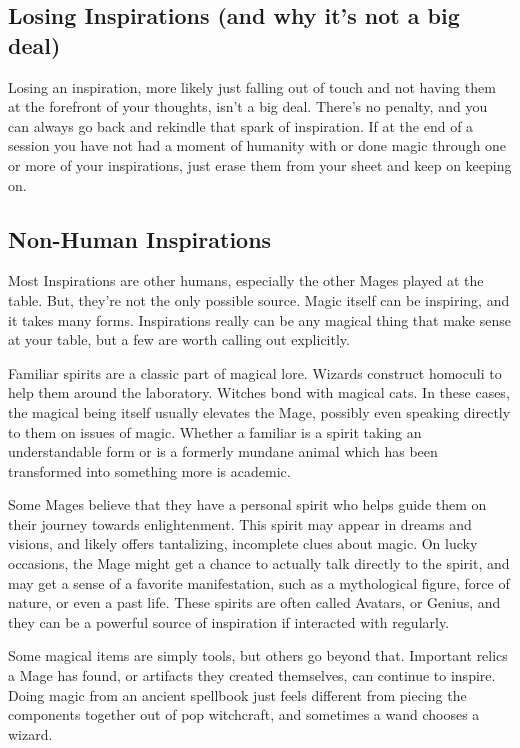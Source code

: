 \documentclass[
  oneside,
  statementpaper,
  9pt]{memoir}
\begin{document}
\hypertarget{losing-inspirations-and-why-its-not-a-big-deal}{%
\subsection{Losing Inspirations (and why it's not a big
deal)}\label{losing-inspirations-and-why-its-not-a-big-deal}}

\begin{Player}

Losing an inspiration, more likely just falling out of touch and not having them at the forefront of your thoughts, isn’t a big deal. There’s no penalty, and you can always go back and rekindle that spark of inspiration. If at the end of a session you have not had a moment of humanity with or done magic through one or more of your inspirations, just erase them from your sheet and keep on keeping on.

\end{Player}

\hypertarget{non-human-inspirations}{%
\subsection{Non-Human Inspirations}\label{non-human-inspirations}}

\begin{Player}

Most Inspirations are other humans, especially the other Mages played at the table. But, they’re not the only possible source. Magic itself can be inspiring, and it takes many forms. Inspirations really can be any magical thing that make sense at your table, but a few are worth calling out explicitly.

Familiar spirits are a classic part of magical lore. Wizards construct homoculi to help them around the laboratory. Witches bond with magical cats. In these cases, the magical being itself usually elevates the Mage, possibly even speaking directly to them on issues of magic. Whether a familiar is a spirit taking an understandable form or is a formerly mundane animal which has been transformed into something more is academic.

Some Mages believe that they have a personal spirit who helps guide them on their journey towards enlightenment. This spirit may appear in dreams and visions, and likely offers tantalizing, incomplete clues about magic. On lucky occasions, the Mage might get a chance to actually talk directly to the spirit, and may get a sense of a favorite manifestation, such as a mythological figure, force of nature, or even a past life. These spirits are often called Avatars, or Genius, and they can be a powerful source of inspiration if interacted with regularly.

Some magical items are simply tools, but others go beyond that. Important relics a Mage has found, or artifacts they created themselves, can continue to inspire. Doing magic from an ancient spellbook just feels different from piecing the components together out of pop witchcraft, and sometimes a wand chooses a wizard.

\end{Player}
\end{document}
